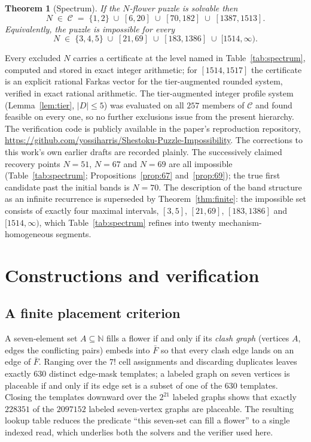 \documentclass[11pt]{article}
\newtheorem{theorem}{Theorem}
\theoremstyle{definition}
\theoremstyle{remark}
\newcommand{\NN}{\mathbb{N}}
\begin{document}
\begin{theorem}[Spectrum]\label{thm:spectrum}
If the $N$-flower puzzle is solvable then
\[
N \;\in\; \mathcal{C} \;=\; \{1,2\}\;\cup\;[6,20]\;\cup\;[70,182]\;\cup\;[1387,1513].
\]
Equivalently, the puzzle is impossible for every
\[
N \;\in\; \{3,4,5\}\;\cup\;[21,69]\;\cup\;[183,1386]\;\cup\;[1514,\infty).
\]
\end{theorem}

Every excluded $N$ carries a certificate at the level named in Table~\ref{tab:spectrum}, computed and stored in exact integer arithmetic; for $[1514,1517]$ the certificate is an explicit rational Farkas vector for the tier-augmented rounded system, verified in exact rational arithmetic.  The tier-augmented integer profile system (Lemma~\ref{lem:tier}, $|D|\le 5$) was evaluated on all $257$ members of $\mathcal{C}$ and found feasible on every one, so no further exclusions issue from the present hierarchy. The verification code is publicly available in the paper's reproduction repository, \url{https://github.com/yossiharris/Shestoku-Puzzle-Impossibility}.
The corrections to this work's own earlier drafts are recorded plainly. The successively claimed recovery points $N=51$, $N=67$ and $N=69$ are all impossible (Table~\ref{tab:spectrum}; Propositions~\ref{prop:67} and~\ref{prop:69}); the true first candidate past the initial bands is $N=70$. The description of the band structure as an infinite recurrence is superseded by Theorem~\ref{thm:finite}: the impossible set consists of exactly four maximal intervals, $[3,5]$, $[21,69]$, $[183,1386]$ and $[1514,\infty)$, which Table~\ref{tab:spectrum} refines into twenty mechanism-homogeneous segments.

\section{Constructions and verification}\label{sec:constructions}

\subsection{A finite placement criterion}

A seven-element set $A\subseteq\NN$ fills a flower if and only if its \emph{clash graph} (vertices $A$, edges the conflicting pairs) embeds into $\bar F$ so that every clash edge lands on an edge of $\bar F$. Ranging over the $7!$ cell assignments and discarding duplicates leaves exactly $630$ distinct edge-mask templates; a labeled graph on seven vertices is placeable if and only if its edge set is a subset of one of the $630$ templates. Closing the templates downward over the $2^{21}$ labeled graphs shows that exactly $228351$ of the $2097152$ labeled seven-vertex graphs are placeable. The resulting lookup table reduces the predicate ``this seven-set can fill a flower'' to a single indexed read, which underlies both the solvers and the verifier used here.
\end{document}
